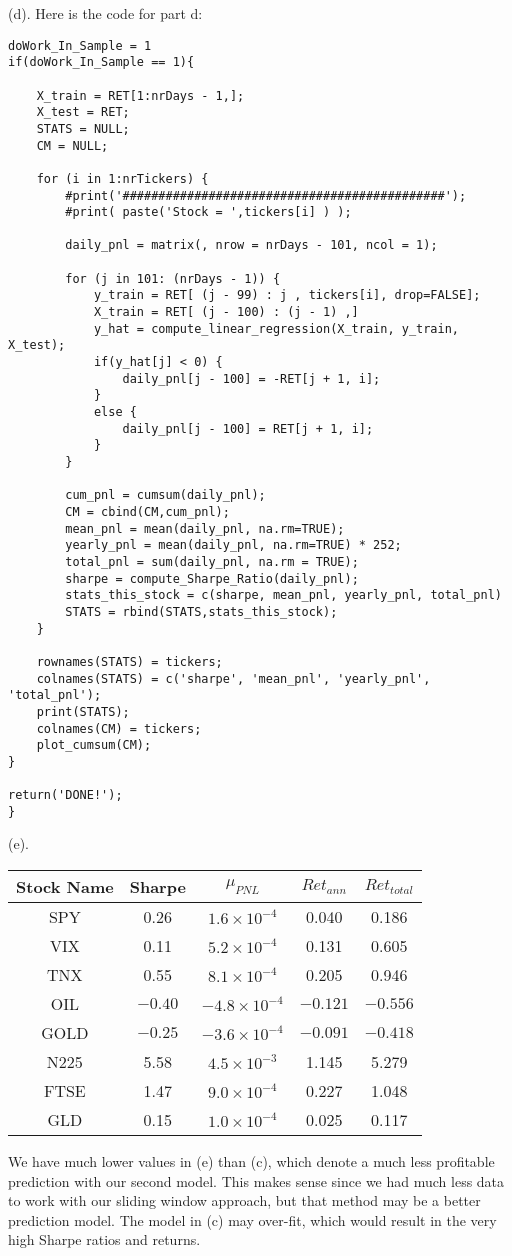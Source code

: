 \documentclass[12pt]{article}
\begin{document}
\newpage
(d). Here is the code for part d:
\begin{lstlisting}
doWork_In_Sample = 1
if(doWork_In_Sample == 1){

	X_train = RET[1:nrDays - 1,];
	X_test = RET;
	STATS = NULL;
	CM = NULL;

	for (i in 1:nrTickers) {
		#print('#############################################');
		#print( paste('Stock = ',tickers[i] ) );

		daily_pnl = matrix(, nrow = nrDays - 101, ncol = 1);

		for (j in 101: (nrDays - 1)) {
			y_train = RET[ (j - 99) : j , tickers[i], drop=FALSE];
			X_train = RET[ (j - 100) : (j - 1) ,]
			y_hat = compute_linear_regression(X_train, y_train, X_test);
			if(y_hat[j] < 0) {
				daily_pnl[j - 100] = -RET[j + 1, i];
			}
			else {
				daily_pnl[j - 100] = RET[j + 1, i];
			}
		}

		cum_pnl = cumsum(daily_pnl);
		CM = cbind(CM,cum_pnl);
		mean_pnl = mean(daily_pnl, na.rm=TRUE);
		yearly_pnl = mean(daily_pnl, na.rm=TRUE) * 252;
		total_pnl = sum(daily_pnl, na.rm = TRUE);
		sharpe = compute_Sharpe_Ratio(daily_pnl);
		stats_this_stock = c(sharpe, mean_pnl, yearly_pnl, total_pnl)
		STATS = rbind(STATS,stats_this_stock);
	}
	
	rownames(STATS) = tickers;
	colnames(STATS) = c('sharpe', 'mean_pnl', 'yearly_pnl', 'total_pnl');
	print(STATS);
	colnames(CM) = tickers;
	plot_cumsum(CM);
}

return('DONE!');
}
\end{lstlisting}
\newpage
(e). \\
\begin{center}
\begin{tabular}{|c|c|c|c|c|}
\hline
Stock Name & Sharpe & $\mu_{PNL}$ & $Ret_{ann}$ & $Ret_{total}$ \\
\hline
SPY & 0.26 & $1.6 \times 10^{-4}$ & 0.040 & 0.186 \\
\hline
VIX & 0.11 & $5.2 \times 10^{-4}$ & 0.131 & 0.605 \\
\hline
TNX & 0.55 & $8.1 \times 10^{-4}$ & 0.205 & 0.946 \\
\hline
OIL & $-0.40$ & $-4.8 \times 10^{-4}$ & $-0.121$ & $-0.556$ \\
\hline
GOLD & $-0.25$ & $-3.6 \times 10^{-4}$ & $-0.091$ & $-0.418$ \\
\hline
N225 & 5.58 & $4.5 \times 10^{-3}$ & 1.145 & 5.279 \\
\hline
FTSE & 1.47 & $9.0 \times 10^{-4}$ & 0.227 & 1.048 \\
\hline
GLD & 0.15 & $1.0 \times 10^{-4}$ & 0.025 & 0.117 \\
\hline
\end{tabular}
\end{center}
\hfill \break
We have much lower values in (e) than (c), which denote a much less profitable prediction with our second model. This makes sense since we had much less data to work with our sliding window approach, but that method may be a better prediction model. The model in (c) may over-fit, which would result in the very high Sharpe ratios and returns.
\end{document}
